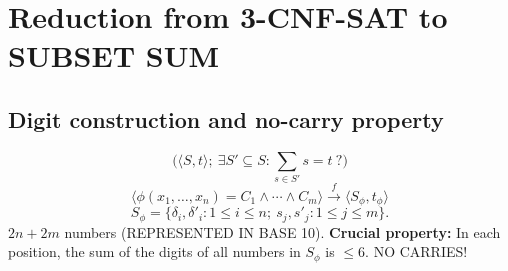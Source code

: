 \section{Reduction from 3-CNF-SAT to SUBSET SUM}
\subsection{Digit construction and no-carry property}
\[\bigl(\langle S,t\rangle;\ \exists S'\subseteq S:\sum_{s\in S'}s=t\ ?\bigr)\]
\[
\langle\phi(x_1,\ldots,x_n)=C_1\land\cdots\land C_m\rangle
\xrightarrow{f}\langle S_\phi,t_\phi\rangle
\]
\[S_\phi=\{\delta_i,\delta'_i:1\leq i\leq n;\ s_j,s'_j:1\leq j\leq m\}.\]
$2n+2m$ numbers (REPRESENTED IN BASE 10).
\textbf{Crucial property:} In each position, the sum of the digits of all numbers in $S_\phi$ is $\leq6$. NO CARRIES!
